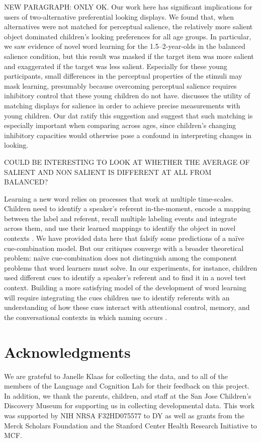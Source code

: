 \documentclass[man,floatsintext]{apa6}
\begin{document}
NEW PARAGRAPH: ONLY OK. Our work here has significant implications for users of two-alternative preferential looking displays. We found that, when alternatives were not matched for perceptual salience, the relatively more salient object dominated children's looking preferences for all age groups. In particular, we saw evidence of novel word learning for the 1.5--2-year-olds in the balanced salience condition, but this result was masked if the target item was more salient and exaggerated if the target was less salient. Especially for these young participants, small differences in the perceptual properties of the stimuli may mask learning, presumably because overcoming perceptual salience requires inhibitory control that these young children do not have.  discusses the utility of matching displays for salience in order to achieve precise measurements with young children. Our dat ratify this suggestion and suggest that such matching is especially important when comparing across ages, since children's changing inhibitory capacities would otherwise pose a confound in interpreting changes in looking.

COULD BE INTERESTING TO LOOK AT WHETHER THE AVERAGE OF SALIENT AND NON SALIENT IS DIFFERENT AT ALL FROM BALANCED?

Learning a new word relies on processes that work at multiple time-scales. Children need to identify a speaker's referent in-the-moment, encode a mapping between the label and referent, recall multiple labeling events and integrate across them, and use their learned mappings to identify the object in novel contexts \cite{Frank2009a,McMurray2012, Yu2012b}. We have provided data here that falsify some predictions of a na\"ive cue-combination model. But our critiques converge with a broader theoretical problem: na\"{i}ve cue-combination does not distinguish among the component problems that word learners must solve. In our experiments, for instance, children used different cues to identify a speaker's referent and to find it in a novel test context. Building a more satisfying model of the development of word learning will require integrating the cues children use to identify referents with an understanding of how these cues interact with attentional control, memory, and the conversational contexts in which naming occurs \cite{Frank2013a, Yurovsky2013c}.

\section{Acknowledgments}

We are grateful to Janelle Klaas for collecting the data, and to  all of the members of the Language and Cognition Lab for their feedback on this project. In addition, we thank the parents, children, and staff at the San Jose Children's Discovery Museum for supporting us in collecting developmental data. This work was supported by NIH NRSA F32HD075577 to DY as well as grants from the Merck Scholars Foundation and the Stanford Center Health Research Initiative to MCF.



\end{document}

